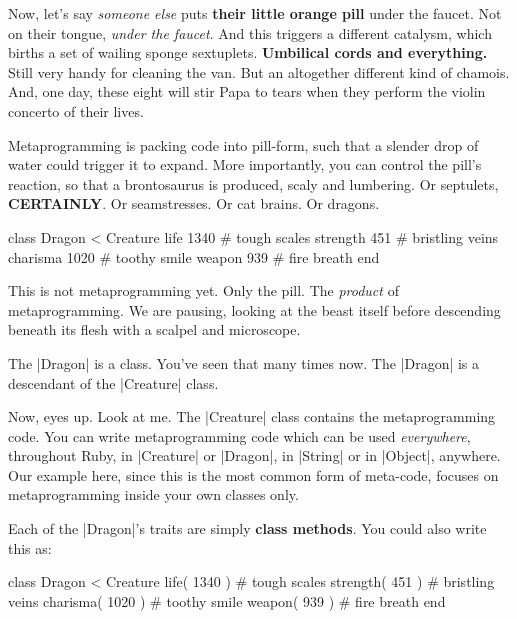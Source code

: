 \documentclass[12pt,twoside]{report}
\begin{document}
Now, let's say {\em someone else} puts {\bf their little orange pill}
under the faucet.  Not on their tongue, {\em under the faucet}.  And
this triggers a different catalysm, which births a set of wailing
sponge sextuplets.  {\bf Umbilical cords and everything.}  Still very
handy for cleaning the van. But an altogether different kind of
chamois.  And, one day, these eight will stir Papa to tears when they
perform the violin concerto of their lives.

Metaprogramming is packing code into pill-form, such that a slender
drop of water could trigger it to expand. More importantly, you can
control the pill's reaction, so that a brontosaurus is produced, scaly
and lumbering. Or septulets, {\bf CERTAINLY}.  Or seamstresses.  Or
cat brains.  Or dragons.

\begin{rubycode}

 class Dragon < Creature
   life 1340     # tough scales
   strength 451  # bristling veins
   charisma 1020 # toothy smile
   weapon 939    # fire breath
 end

\end{rubycode}


This is not metaprogramming yet.  Only the pill.  The {\em product} of
metaprogramming.  We are pausing, looking at the beast itself before
descending beneath its flesh with a scalpel and microscope.

The \rubyinline|Dragon| is a class.  You've seen that
many times now.  The \rubyinline|Dragon| is a
descendant of the \rubyinline|Creature| class.

Now, eyes up.  Look at me.  The \rubyinline|Creature|
class contains the metaprogramming code.  You can write
metaprogramming code which can be used {\em everywhere}, throughout
Ruby, in \rubyinline|Creature| or
\rubyinline|Dragon|, in
\rubyinline|String| or in
\rubyinline|Object|, anywhere. Our example here, since
this is the most common form of meta-code, focuses on metaprogramming
inside your own classes only.

Each of the \rubyinline|Dragon|'s traits are simply
{\bf class methods}.  You could also write this as:


\begin{rubycode}

 class Dragon < Creature
   life( 1340 )     # tough scales
   strength( 451 )  # bristling veins
   charisma( 1020 ) # toothy smile
   weapon( 939 )    # fire breath
 end

\end{rubycode}
\end{document}
